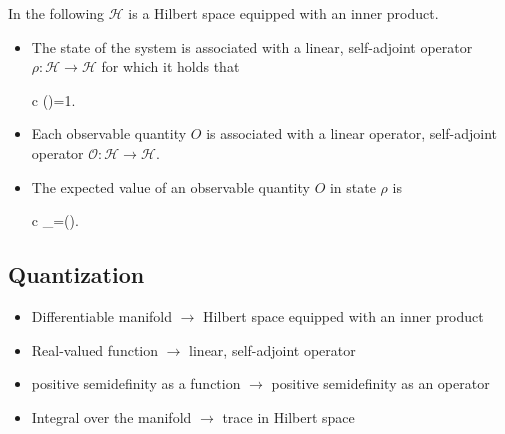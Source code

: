 \documentclass[11pt,%
]{memoir}
\newenvironment{eqna}{\begin{IEEEeqnarray}{c}}{\end{IEEEeqnarray}\ignorespacesafterend}
\DeclareMathOperator{\Tr}{Tr}
\begin{document}
In the following \(\mathcal{H}\) is a Hilbert space equipped with an inner product.

\begin{itemize}
    \item The state of the system is associated with a linear, self-adjoint operator \(\rho:\mathcal{H}\rightarrow\mathcal{H}\) for which it holds that
    \begin{eqna}
        \braket{\psi|\rho|\psi}\qquad{}\qquad\Tr(\rho)=1.\nonumber
    \end{eqna}
    \item Each observable quantity \(O\) is associated with a linear operator, self-adjoint operator \(\mathcal{O}:\mathcal{H}\rightarrow\mathcal{H}\).
    \item The expected value of an observable quantity \(O\) in state \(\rho\) is
    \begin{eqna}
        \langle{}\rangle_\rho=\Tr(\rho{}).\nonumber
    \end{eqna}
\end{itemize}

\subsection{Quantization}
\begin{itemize}
    \item Differentiable manifold \(\rightarrow\) Hilbert space equipped with an inner product
    \item Real-valued function \(\rightarrow\) linear, self-adjoint operator
    \item positive semidefinity as a function \(\rightarrow\) positive semidefinity as an operator
    \item Integral over the manifold \(\rightarrow\) trace in Hilbert space
\end{itemize}

\end{document}
